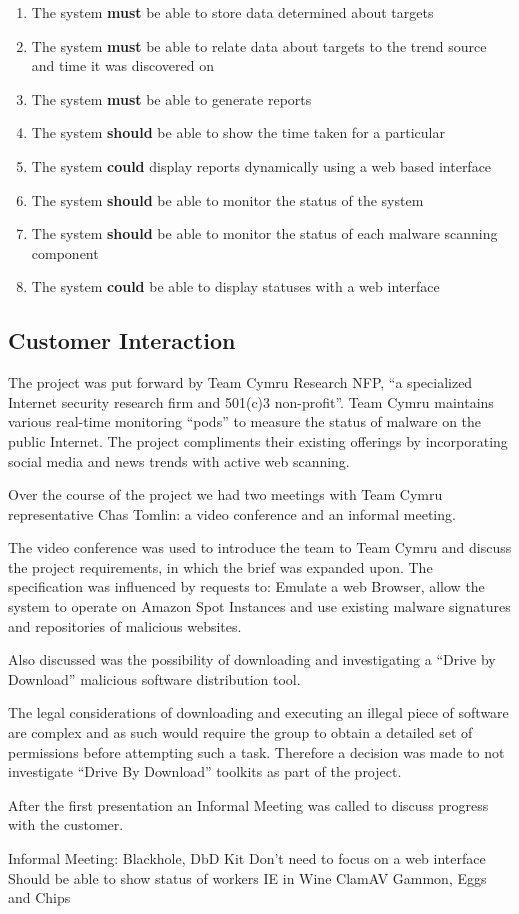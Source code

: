 \begin{enumerate}
    \item The system \textbf{must} be able to store data determined about targets
    \item The system \textbf{must} be able to relate data about targets to the trend source and time it was discovered on
    \item The system \textbf{must} be able to generate reports
    \item The system \textbf{should} be able to show the time taken for a particular 
    \item The system \textbf{could} display reports dynamically using a web based interface
    \item The system \textbf{should} be able to monitor the status of the system
    \item The system \textbf{should} be able to monitor the status of each malware scanning component
    \item The system \textbf{could} be able to display statuses with a web interface
\end{enumerate}

\subsection{Customer Interaction}
The project was put forward by Team Cymru Research NFP, ``a specialized Internet security research firm and 501(c)3 non-profit''\cite{team-cymru}. Team Cymru maintains various real-time monitoring ``pods'' to measure the status of malware on the public Internet. The project compliments their existing offerings by incorporating social media and news trends with active web scanning.

Over the course of the project we had two meetings with Team Cymru representative Chas Tomlin: a video conference and an informal meeting.

The video conference was used to introduce the team to Team Cymru and discuss the project requirements, in which the brief was expanded upon. The specification was influenced by requests to: Emulate a web Browser, allow the system to operate on Amazon Spot Instances and use existing malware signatures and repositories of malicious websites.

Also discussed was the possibility of downloading and investigating a ``Drive by Download'' malicious software distribution tool.

The legal considerations of downloading and executing an illegal piece of software are complex and as such would require the group to obtain a detailed set of permissions before attempting such a task. Therefore a decision was made to not investigate ``Drive By Download'' toolkits as part of the project.

After the first presentation an Informal Meeting was called to discuss progress with the customer.

Informal Meeting:
    Blackhole, DbD Kit
    Don't need to focus on a web interface
    Should be able to show status of workers
    IE in Wine
    ClamAV
    Gammon, Eggs and Chips



